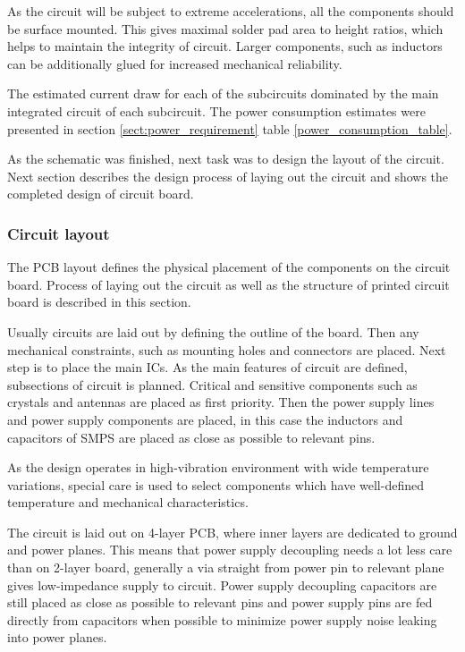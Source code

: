 As the circuit will be subject to extreme accelerations, all the components should be surface mounted. This gives maximal solder pad area to height ratios, which helps to maintain the integrity of circuit. Larger components, such as inductors can be additionally glued for increased mechanical reliability.

The estimated current draw for each of the subcircuits dominated by the main integrated circuit of each subcircuit. The power consumption estimates were presented in section \ref{sect:power_requirement} table \ref{power_consumption_table}.

As the schematic was finished, next task was to design the layout of the circuit. Next section describes the design process of laying out the circuit and shows the completed design of circuit board.

\subsubsection{Circuit layout}
The PCB layout defines the physical placement of the components on the circuit board. Process of laying out the circuit as well as the structure of printed circuit board is described in this section.

Usually circuits are laid out by defining the outline of the board. Then any mechanical constraints, such as mounting holes and connectors are placed. Next step is to place the main ICs. As the main features of circuit are defined, subsections of circuit is planned. Critical and sensitive components such as crystals and antennas are placed as first priority. Then the power supply lines and power supply components are placed, in this case the inductors and capacitors of SMPS are placed as close as possible to relevant pins. 

As the design operates in high-vibration environment with wide temperature variations, special care is used to select components which have well-defined temperature and mechanical characteristics.

The circuit is laid out on 4-layer PCB, where inner layers are dedicated to ground and power planes. This means that power supply decoupling needs a lot less care than on 2-layer board, generally a via straight from power pin to relevant plane gives low-impedance supply to circuit. Power supply decoupling capacitors are still placed as close as possible to relevant pins and power supply pins are fed directly from capacitors when possible to minimize power supply noise leaking into power planes.

